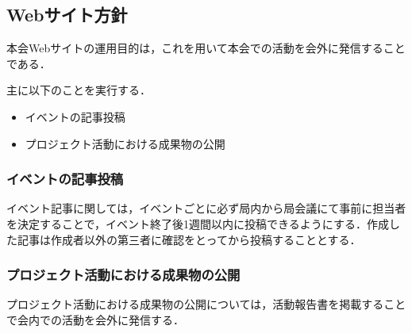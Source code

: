 \subsection*{Webサイト方針}


本会Webサイトの運用目的は，これを用いて本会での活動を会外に発信することである．

主に以下のことを実行する．
\begin{itemize}
\item イベントの記事投稿
\item プロジェクト活動における成果物の公開
\end{itemize}

\subsubsection*{イベントの記事投稿}
イベント記事に関しては，イベントごとに必ず局内から局会議にて事前に担当者を決定することで，イベント終了後1週間以内に投稿できるようにする．作成した記事は作成者以外の第三者に確認をとってから投稿することとする．

\subsubsection*{プロジェクト活動における成果物の公開}
プロジェクト活動における成果物の公開については，活動報告書を掲載することで会内での活動を会外に発信する．